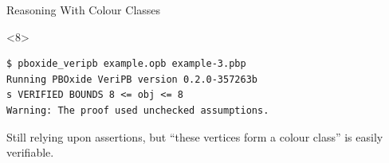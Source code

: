 \documentclass[aspectratio=169,compress,10pt]{beamer}
\begin{document}
\begin{frame}[fragile,t]{Reasoning With Colour Classes}
\begin{onlyenv}
%
\end{onlyenv}\begin{onlyenv}<8>%
\begin{Verbatim}
$ pboxide_veripb example.opb example-3.pbp
Running PBOxide VeriPB version 0.2.0-357263b
s VERIFIED BOUNDS 8 <= obj <= 8
Warning: The proof used unchecked assumptions.
\end{Verbatim}

\bigskip

Still relying upon assertions, but ``these vertices form a colour class'' is easily verifiable.
\end{onlyenv}
\end{frame}
\end{document}
